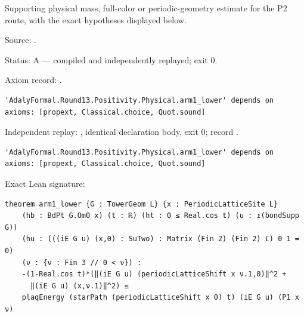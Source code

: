 \begin{theorem}[bp-484]
\label{bp-484}
\leanok
Supporting physical mass, full-color or periodic-geometry estimate for the P2 route, with the exact hypotheses displayed below.

\par Source: \texttt{}.
\par Status: A — compiled and independently replayed; exit 0.
\par Axiom record: \texttt{}.
\begin{verbatim}
'AdalyFormal.Round13.Positivity.Physical.arm1_lower' depends on axioms: [propext, Classical.choice, Quot.sound]
\end{verbatim}
\par Independent replay: \texttt{}, identical declaration body, exit 0; record \texttt{}.
\begin{verbatim}
'AdalyFormal.Round13.Positivity.Physical.arm1_lower' depends on axioms: [propext, Classical.choice, Quot.sound]
\end{verbatim}
\par Exact Lean signature:
\begin{verbatim}
theorem arm1_lower {G : TowerGeom L} {x : PeriodicLatticeSite L}
    (hb : BdPt G.Om0 x) (t : ℝ) (ht : 0 ≤ Real.cos t) (u : ↥(bondSupp G))
    (hu : (((iE G u) (x,0) : SuTwo) : Matrix (Fin 2) (Fin 2) ℂ) 0 1 = 0)
    (ν : {ν : Fin 3 // 0 < ν}) :
    -(1-Real.cos t)*(‖(iE G u) (periodicLatticeShift x ν.1,0)‖^2 +
      ‖(iE G u) (x,ν.1)‖^2) ≤
    plaqEnergy (starPath (periodicLatticeShift x 0) t) (iE G u) (P1 x ν)
\end{verbatim}
\end{theorem}

